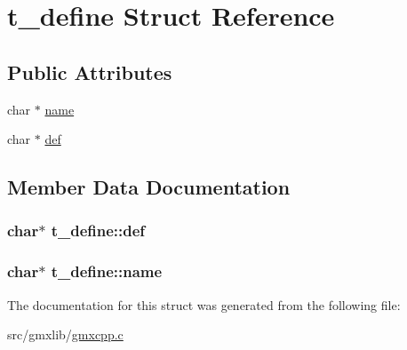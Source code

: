 \hypertarget{structt__define}{\section{t\-\_\-define \-Struct \-Reference}
\label{structt__define}
}
\subsection*{\-Public \-Attributes}
\begin{DoxyCompactItemize}
\item 
char $\ast$ \hyperlink{structt__define_a8ba456c9e6a28cfbfcdff1f5299f791f}{name}
\item 
char $\ast$ \hyperlink{structt__define_a63f1d8f039f27ecdb00c576f88511cc2}{def}
\end{DoxyCompactItemize}


\subsection{\-Member \-Data \-Documentation}
\hypertarget{structt__define_a63f1d8f039f27ecdb00c576f88511cc2}{
\subsubsection[{def}]{\setlength{\rightskip}{0pt plus 5cm}char$\ast$ {\bf t\-\_\-define\-::def}}}\label{structt__define_a63f1d8f039f27ecdb00c576f88511cc2}
\hypertarget{structt__define_a8ba456c9e6a28cfbfcdff1f5299f791f}{
\subsubsection[{name}]{\setlength{\rightskip}{0pt plus 5cm}char$\ast$ {\bf t\-\_\-define\-::name}}}\label{structt__define_a8ba456c9e6a28cfbfcdff1f5299f791f}


\-The documentation for this struct was generated from the following file\-:\begin{DoxyCompactItemize}
\item 
src/gmxlib/\hyperlink{gmxcpp_8c}{gmxcpp.\-c}\end{DoxyCompactItemize}
